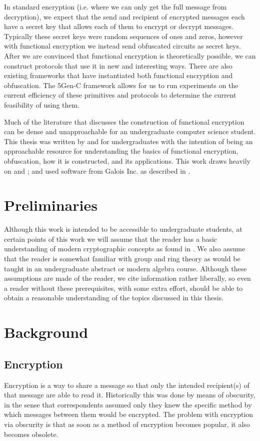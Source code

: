 \documentclass[12pt,twoside]{reedthesis}
\begin{document}
	\par In standard encryption (i.e. where we can only get the full message from decryption), we expect that the send and recipient of encrypted messages each have a secret key that allows each of them to encrypt or decrypt messages. Typically these secret keys were random sequences of ones and zeros, however with functional encryption we instead send obfuscated circuits as secret keys.  
	 After we are convinced that functional encryption is theoretically possible, we can construct protocols that use it in new and interesting ways. There are also existing frameworks that have instantiated both functional encryption and obfuscation. The 5Gen-C framework allows for us to run experiments on the current efficiency of these primitives and protocols to determine the current feasibility of using them.
	\par Much of the literature that discusses the construction of functional encryption can be dense and unapproachable for an undergraduate computer science student. This thesis was written by and for undergraduates with the intention of being an approachable resource for understanding the basics of functional encryption, obfuscation, how it is constructed, and its applications. This work draws heavily on \cite{Garg:2013} and \cite{GGH13}; and used software from Galois Inc. as described in \cite{5genc}.
    
   
    
    \chapter*{Preliminaries}
     Although this work is intended to be accessible to undergraduate students, at certain points of this work we will assume that the reader has a basic understanding of modern cryptographic concepts as found in \cite{Katz:2007:IMC:1206501}. We also assume that the reader is somewhat familiar with group and ring theory as would be taught in an undergraduate abstract or modern algebra course. Although these assumptions are made of the reader, we cite information rather liberally, so even a reader without these prerequisites, with some extra effort, should be able to obtain a reasonable understanding of the topics discussed in this thesis.
    
    \chapter{Background}
    \section{Encryption}
    Encryption is a way to share a message so that only the intended recipient(s) of
    that message are able to read it. Historically this was done by means of obscurity, in the sense that correspondents assumed only they knew the specific method by which messages between them would be encrypted. The problem with encryption via obscurity is that as soon as a method of encryption becomes popular, it also becomes obsolete.
\end{document}
